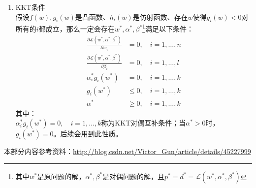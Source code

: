 \begin{enumerate}
	\item KKT条件 \\
	假设$f(w), g_i(w)$是凸函数、$h_i(w)$是仿射函数、存在$w$使得$g_i(w) < 0$对所有的$i$都成立，那么一定会存在$w^*, \alpha^*, \beta^*$\footnote{其中$w^*$是原问题的解，$\alpha^*, \beta^*$是对偶问题的解，且$p^*=d^*=\mathcal{L}(w^*, \alpha^*, \beta^*)$}满足以下条件：
	\begin{align}
		\frac{\partial\mathcal{L}(w^*, \alpha^*, \beta^*)}{\partial w_i} &= 0, \quad i=1, \dots, n \\
		\frac{\partial\mathcal{L}(w^*, \alpha^*, \beta^*)}{\partial \beta_i} &= 0, \quad i=1, \dots, l \\
		\alpha_i^*g_i(w^*) &= 0, \quad i=1, \dots, k \\
		g_i(w^*) &\leq 0, \quad i=1, \dots, k  \\
		\alpha^* &\geq 0, \quad i=1, \dots, k 
	\end{align}
	其中：\\
	$\alpha_i^*g_i(w^*) = 0, \quad i=1, \dots, k$称为KKT对偶互补条件；当$\alpha^* > 0$时，$g_i(w^*) = 0$。后续会用到此性质。
\end{enumerate}
本部分内容参考资料：\url{http://blog.csdn.net/Victor_Gun/article/details/45227999}








































